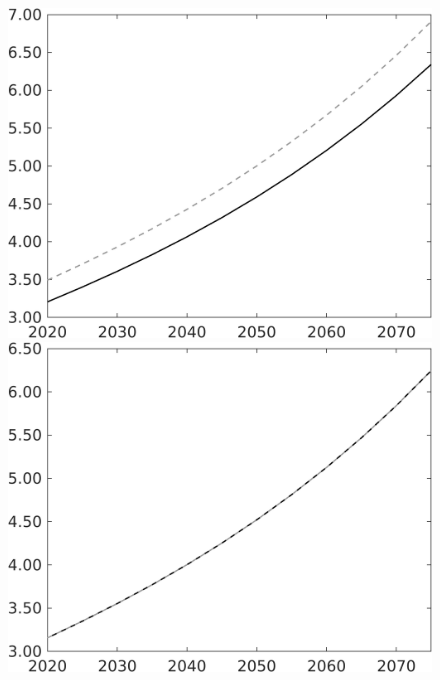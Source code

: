 \documentclass[12pt]{article}
\begin{document}
\begin{figure}[h!!]
\begin{minipage}[]{0.32\textwidth}
	\end{minipage}	
	\begin{minipage}[]{0.32\textwidth}
		\includegraphics[width=1\textwidth]{../../codding_model/own_basedOnFried/optimalPol_010922_revision/figures/all_13Sept22/CompTaul_Equlab_LFBAU_Reg0_Y_spillover0_nsk1_xgr1_knspil0_sep1_countec0_GovRev0_etaa0.79_lgd0.png}
	\end{minipage}	
	\begin{minipage}[]{0.32\textwidth}
		\includegraphics[width=1\textwidth]{../../codding_model/own_basedOnFried/optimalPol_010922_revision/figures/all_13Sept22/CompTaul_Equlab_LFBAU_Reg0_wh_spillover0_nsk1_xgr1_knspil0_sep1_countec0_GovRev0_etaa0.79_lgd0.png}

\end{minipage}
\end{figure}
\end{document}
